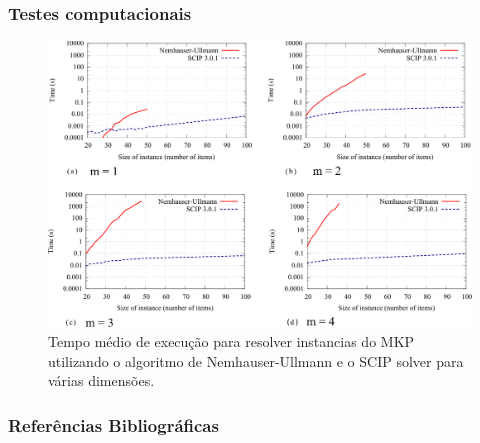 \documentclass[10pt,fleqn]{beamer}
\begin{document}
\begin{frame}
  \frametitle{Testes computacionais}
  \begin{figure}
	\begin{center}
      \includegraphics[scale=0.5]{graficos/scip}
	\end{center}
  \caption{\scriptsize Tempo médio de execução para resolver instancias do MKP
  utilizando o algoritmo de Nemhauser-Ullmann e o SCIP solver para várias dimensões.
  }
  \end{figure}
\end{frame}


\begin{frame}
  \frametitle{Referências Bibliográficas}
  \nocite{weingartner1967methods}
  \nocite{nemhauser1969discrete}
  \nocite{beier2003random}
  \nocite{beier2006experimental}
  
  { \small
  
  }
\end{frame}
\end{document}
